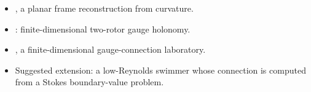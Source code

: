 \begin{itemize}
\item {}, a planar frame reconstruction
from curvature.
\item {}: finite-dimensional
two-rotor gauge holonomy.
\item {}, a finite-dimensional
gauge-connection laboratory.
\item Suggested extension: a low-Reynolds swimmer whose connection is computed
from a Stokes boundary-value problem.
\end{itemize}
